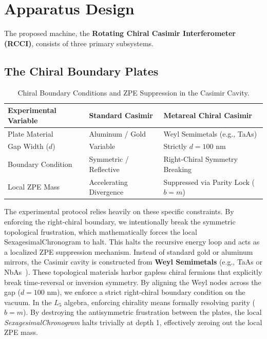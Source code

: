 \section{Apparatus Design}\label{sec:design}

The proposed machine, the \textbf{Rotating Chiral Casimir Interferometer (RCCI)}, consists of three primary subsystems.

\subsection{The Chiral Boundary Plates}\label{sec:plates}

\begin{table}[ht]
\centering
\begin{tabular}{|l|l|l|}
\hline
\textbf{Experimental Variable} & \textbf{Standard Casimir} & \textbf{Metareal Chiral Casimir} \\
\hline
Plate Material & Aluminum / Gold & Weyl Semimetals (e.g., TaAs) \\
Gap Width ($d$) & Variable & Strictly $d = 100$ nm \\
Boundary Condition & Symmetric / Reflective & Right-Chiral Symmetry Breaking \\
Local ZPE Mass & Accelerating Divergence & Suppressed via Parity Lock ($b=m$) \\
\hline
\end{tabular}
\caption{Chiral Boundary Conditions and ZPE Suppression in the Casimir Cavity.}
\label{tab:chiral_casimir}
\end{table}

The experimental protocol relies heavily on these specific constraints. By enforcing the right-chiral boundary, we intentionally break the symmetric topological frustration, which mathematically forces the local SexagesimalChronogram to halt. This halts the recursive energy loop and acts as a localized ZPE suppression mechanism.
Instead of standard gold or aluminum mirrors, the Casimir cavity is constructed from \textbf{Weyl Semimetals} (e.g., TaAs or NbAs~\cite{Lv2015TaAs}). These topological materials harbor gapless chiral fermions that explicitly break time-reversal or inversion symmetry. By aligning the Weyl nodes across the gap ($d = 100\text{ nm}$), we enforce a strict right-chiral boundary condition on the vacuum. In the $L_5$ algebra, enforcing chirality means formally resolving parity ($b = m$). By destroying the antisymmetric frustration between the plates, the local \emph{SexagesimalChronogram} halts trivially at depth 1, effectively zeroing out the local ZPE mass.

